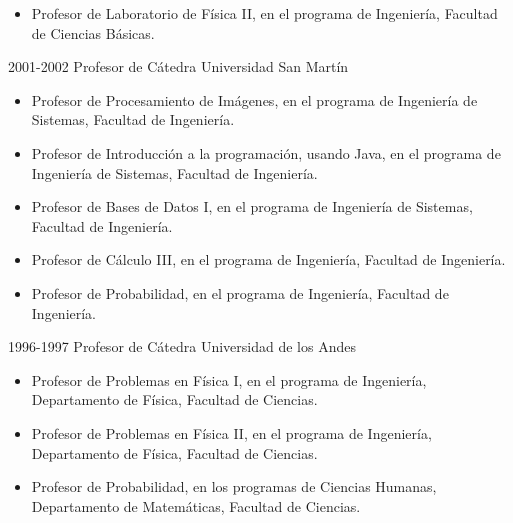 \begin{entrylist}
  \entry
    {}{}{}
    {\begin{itemize}
       \item{Profesor de Laboratorio de Física II, en el programa de Ingeniería, Facultad de Ciencias Básicas.}
     \end{itemize}}
  \entry
    {2001-2002}
    {Profesor de Cátedra}
    {Universidad San Martín}
    {\begin{itemize}
       \item{Profesor de Procesamiento de Imágenes, en el programa de Ingeniería de Sistemas, Facultad de Ingeniería.}
       \item{Profesor de Introducción a la programación, usando Java, en el programa de Ingeniería de Sistemas, Facultad de Ingeniería.}
       \item{Profesor de Bases de Datos I, en el programa de Ingeniería de Sistemas, Facultad de Ingeniería.}
       \item{Profesor de Cálculo III, en el programa de Ingeniería, Facultad de Ingeniería.}
       \item{Profesor de Probabilidad, en el programa de Ingeniería, Facultad de Ingeniería.}
    \end{itemize}}
  \entry
    {1996-1997}
    {Profesor de Cátedra}
    {Universidad de los Andes}
    {\begin{itemize}
       \item{Profesor de Problemas en Física I, en el programa de Ingeniería, Departamento de Física, Facultad de Ciencias.}
       \item{Profesor de Problemas en Física II, en el programa de Ingeniería, Departamento de Física, Facultad de Ciencias.}
       \item{Profesor de Probabilidad, en los programas de Ciencias Humanas, Departamento de Matemáticas, Facultad de Ciencias.}
     \end{itemize}}
\end{entrylist}

